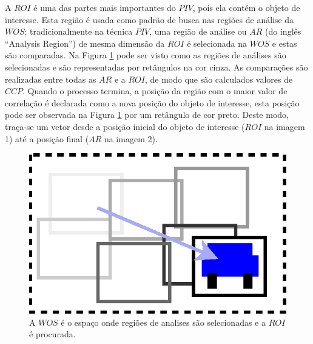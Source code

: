 A $ROI$ é uma das partes mais importantes do $PIV$, pois ela contém o objeto de interesse. 
Esta região é usada como padrão de busca nas regiões de análise da $WOS$;
tradicionalmente na técnica $PIV$, uma região de análise ou $AR$ (do inglês ``Analysis Region'') de mesma dimensão 
da $ROI$ é selecionada na $WOS$ e estas são comparadas.
Na Figura \ref{fig:WOSdivided} pode ser visto como as regiões 
de análises são selecionadas e são representadas por retângulos na cor cinza.
As comparações são realizadas entre todas as $AR$ e a $ROI$, de modo que são 
calculados valores de $CCP$. Quando o processo termina, a posição da região com o maior valor
de correlação é declarada como a nova posição do objeto de interesse, 
esta posição pode ser observada na Figura \ref{fig:WOSdivided}
por um retângulo de cor preto. Deste modo, traça-se um vetor desde a posição inicial do objeto 
de interesse ($ROI$ na imagem 1) até a posição final ($AR$ na imagem 2).
\begin{figure}[H]
\centering
\includegraphics[width=0.8\columnwidth]{images/WOSdivided.eps}
\caption{A $WOS$ é o espaço onde regiões de analises são selecionadas e a $ROI$ é procurada.}
\label{fig:WOSdivided}
\end{figure}
